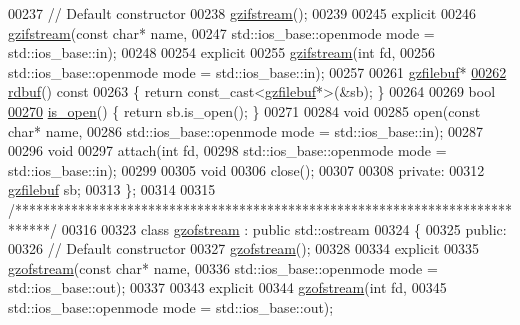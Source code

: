 \begin{DoxyCode}
00237   \textcolor{comment}{//  Default constructor}
00238   \hyperlink{classgzifstream}{gzifstream}();
00239 
00245   \textcolor{keyword}{explicit}
00246   \hyperlink{classgzifstream}{gzifstream}(\textcolor{keyword}{const} \textcolor{keywordtype}{char}* name,
00247              std::ios\_base::openmode mode = std::ios\_base::in);
00248 
00254   \textcolor{keyword}{explicit}
00255   \hyperlink{classgzifstream}{gzifstream}(\textcolor{keywordtype}{int} fd,
00256              std::ios\_base::openmode mode = std::ios\_base::in);
00257 
00261   \hyperlink{classgzfilebuf}{gzfilebuf}*
\hyperlink{classgzifstream_a1c5a0ab4f99f8d8e3406af7bfd82b133}{00262}   \hyperlink{classgzifstream_a1c5a0ab4f99f8d8e3406af7bfd82b133}{rdbuf}()\textcolor{keyword}{ const}
00263 \textcolor{keyword}{  }\{ \textcolor{keywordflow}{return} \textcolor{keyword}{const\_cast<}\hyperlink{classgzfilebuf}{gzfilebuf}*\textcolor{keyword}{>}(&sb); \}
00264 
00269   \textcolor{keywordtype}{bool}
\hyperlink{classgzifstream_a8e9de13b311b698ef0ccc276b71c7941}{00270}   \hyperlink{classgzifstream_a8e9de13b311b698ef0ccc276b71c7941}{is\_open}() \{ \textcolor{keywordflow}{return} sb.is\_open(); \}
00271 
00284   \textcolor{keywordtype}{void}
00285   open(\textcolor{keyword}{const} \textcolor{keywordtype}{char}* name,
00286        std::ios\_base::openmode mode = std::ios\_base::in);
00287 
00296   \textcolor{keywordtype}{void}
00297   attach(\textcolor{keywordtype}{int} fd,
00298          std::ios\_base::openmode mode = std::ios\_base::in);
00299 
00305   \textcolor{keywordtype}{void}
00306   close();
00307 
00308 \textcolor{keyword}{private}:
00312   \hyperlink{classgzfilebuf}{gzfilebuf} sb;
00313 \};
00314 
00315 \textcolor{comment}{/*****************************************************************************/}
00316 
00323 \textcolor{keyword}{class }\hyperlink{classgzofstream}{gzofstream} : \textcolor{keyword}{public} std::ostream
00324 \{
00325 \textcolor{keyword}{public}:
00326   \textcolor{comment}{//  Default constructor}
00327   \hyperlink{classgzofstream}{gzofstream}();
00328 
00334   \textcolor{keyword}{explicit}
00335   \hyperlink{classgzofstream}{gzofstream}(\textcolor{keyword}{const} \textcolor{keywordtype}{char}* name,
00336              std::ios\_base::openmode mode = std::ios\_base::out);
00337 
00343   \textcolor{keyword}{explicit}
00344   \hyperlink{classgzofstream}{gzofstream}(\textcolor{keywordtype}{int} fd,
00345              std::ios\_base::openmode mode = std::ios\_base::out);

\end{DoxyCode}
